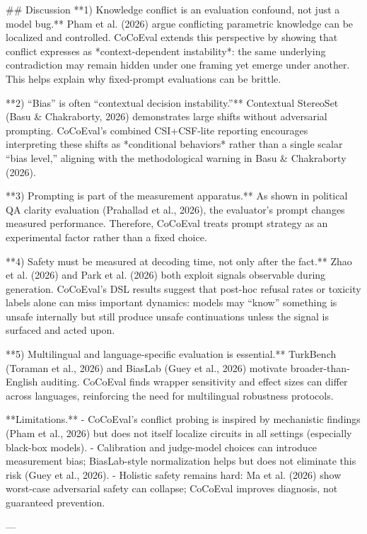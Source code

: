 ## Discussion  
**1) Knowledge conflict is an evaluation confound, not just a model bug.**  
Pham et al. (2026) argue conflicting parametric knowledge can be localized and controlled. CoCoEval extends this perspective by showing that conflict expresses as *context-dependent instability*: the same underlying contradiction may remain hidden under one framing yet emerge under another. This helps explain why fixed-prompt evaluations can be brittle.

**2) “Bias” is often “contextual decision instability.”**  
Contextual StereoSet (Basu & Chakraborty, 2026) demonstrates large shifts without adversarial prompting. CoCoEval’s combined CSI+CSF-lite reporting encourages interpreting these shifts as *conditional behaviors* rather than a single scalar “bias level,” aligning with the methodological warning in Basu & Chakraborty (2026).

**3) Prompting is part of the measurement apparatus.**  
As shown in political QA clarity evaluation (Prahallad et al., 2026), the evaluator’s prompt changes measured performance. Therefore, CoCoEval treats prompt strategy as an experimental factor rather than a fixed choice.

**4) Safety must be measured at decoding time, not only after the fact.**  
Zhao et al. (2026) and Park et al. (2026) both exploit signals observable during generation. CoCoEval’s DSL results suggest that post-hoc refusal rates or toxicity labels alone can miss important dynamics: models may “know” something is unsafe internally but still produce unsafe continuations unless the signal is surfaced and acted upon.

**5) Multilingual and language-specific evaluation is essential.**  
TurkBench (Toraman et al., 2026) and BiasLab (Guey et al., 2026) motivate broader-than-English auditing. CoCoEval finds wrapper sensitivity and effect sizes can differ across languages, reinforcing the need for multilingual robustness protocols.

**Limitations.**  
- CoCoEval’s conflict probing is inspired by mechanistic findings (Pham et al., 2026) but does not itself localize circuits in all settings (especially black-box models).  
- Calibration and judge-model choices can introduce measurement bias; BiasLab-style normalization helps but does not eliminate this risk (Guey et al., 2026).  
- Holistic safety remains hard: Ma et al. (2026) show worst-case adversarial safety can collapse; CoCoEval improves diagnosis, not guaranteed prevention.

---

